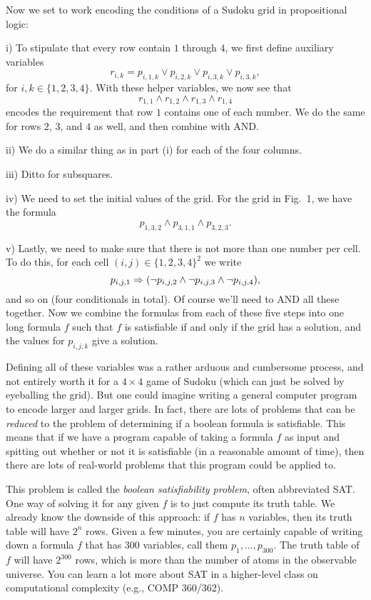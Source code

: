 Now we set to work encoding the conditions of a Sudoku grid in propositional logic:
\medskip
\item{i)} To stipulate that every row contain $1$ through $4$, we first define auxiliary variables
$$r_{i,k} = p_{i,1,k} \vee p_{i,2,k} \vee p_{i,3,k} \vee p_{i,3,k},$$
for $i,k\in \{1,2,3,4\}$.
With these helper variables, we now see that
$$ r_{1,1} \wedge r_{1,2} \wedge r_{1,3} \wedge r_{1,4} $$
encodes the requirement that row $1$ contains one of each number.
We do the same for rows $2$, $3$, and $4$ as well, and then combine with {\mc AND}.
\smallskip
\item{ii)} We do a similar thing as in part (i) for each of the four columns.
\smallskip
\item{iii)} Ditto for subsquares.
\smallskip
\item{iv)} We need to set the initial values of the grid. For the grid in Fig.~1, we have
the formula
$$p_{1,3,2} \wedge p_{3,1,1} \wedge p_{3,2,3}.$$
\smallskip
\item{v)} Lastly, we need to make sure that there is not more than one number per cell. To do
this, for each cell $(i,j)\in \{1,2,3,4\}^2$ we write
$$ p_{i,j,1} \Rightarrow (\neg p_{i,j,2} \wedge \neg p_{i,j,3} \wedge \neg p_{i,j,4}),$$
and so on (four conditionals in total). Of course we'll need to {\mc AND} all these together.
\medskip
Now we combine the formulas from each of these five steps into one long formula $f$ such that
$f$ is satisfiable if and only if the grid has a solution, and the values for $p_{i,j,k}$ give
a solution.

Defining all of these variables was a rather arduous and cumbersome process, and not entirely worth
it for a $4\times 4$ game of Sudoku (which can just be solved by eyeballing the grid).
But one could imagine writing a general computer program to encode larger and larger grids.
In fact, there are lots of problems that can be {\it reduced} to the problem of
determining if a boolean formula is satisfiable. This means that if we have a program
capable of taking a formula $f$ as input and spitting out whether or not it is satisfiable (in a
reasonable amount of time), then there are lots of real-world problems that this program
could be applied to.

This problem is called the {\it boolean satisfiability problem}, often abbreviated {\mc SAT}. One
way of solving it for any given $f$ is to just compute its truth table. We already know the
downside of this approach: if $f$ has $n$ variables, then its truth table will have $2^n$ rows.
Given a few minutes, you are certainly capable of writing down a formula $f$ that has $300$
variables, call them $p_1, \ldots, p_{300}$. The truth table of $f$ will have $2^{300}$ rows,
which is more than the number of atoms in the observable universe. You can learn a lot more
about {\mc SAT} in a higher-level class on computational complexity (e.g., {\mc COMP 360/362}).

